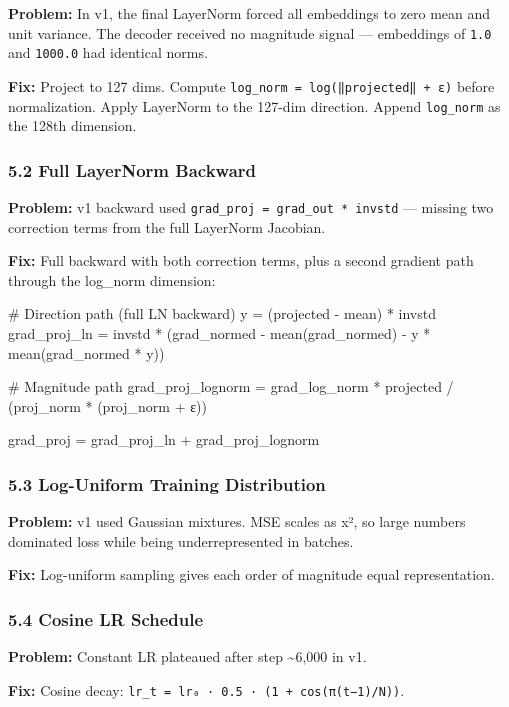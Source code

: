 \documentclass[11pt]{article}
\begin{document}
\textbf{Problem:} In v1, the final LayerNorm forced all embeddings to zero mean and unit variance. The decoder received no magnitude signal — embeddings of \texttt{1.0} and \texttt{1000.0} had identical norms.


\textbf{Fix:} Project to 127 dims. Compute \texttt{log\_norm = log(‖projected‖ + ε)} before normalization. Apply LayerNorm to the 127-dim direction. Append \texttt{log\_norm} as the 128th dimension.


\subsubsection*{5.2 Full LayerNorm Backward}


\textbf{Problem:} v1 backward used \texttt{grad\_proj = grad\_out * invstd} — missing two correction terms from the full LayerNorm Jacobian.


\textbf{Fix:} Full backward with both correction terms, plus a second gradient path through the log\_norm dimension:


\begin{CodeBlock}
# Direction path (full LN backward)
y = (projected - mean) * invstd
grad_proj_ln = invstd * (grad_normed - mean(grad_normed) - y * mean(grad_normed * y))

# Magnitude path
grad_proj_lognorm = grad_log_norm * projected / (proj_norm * (proj_norm + ε))

grad_proj = grad_proj_ln + grad_proj_lognorm
\end{CodeBlock}


\subsubsection*{5.3 Log-Uniform Training Distribution}


\textbf{Problem:} v1 used Gaussian mixtures. MSE scales as x², so large numbers dominated loss while being underrepresented in batches.


\textbf{Fix:} Log-uniform sampling gives each order of magnitude equal representation.


\subsubsection*{5.4 Cosine LR Schedule}


\textbf{Problem:} Constant LR plateaued after step \textasciitilde{}6,000 in v1.


\textbf{Fix:} Cosine decay: \texttt{lr\_t = lr₀ · 0.5 · (1 + cos(π(t−1)/N))}.
\end{document}
